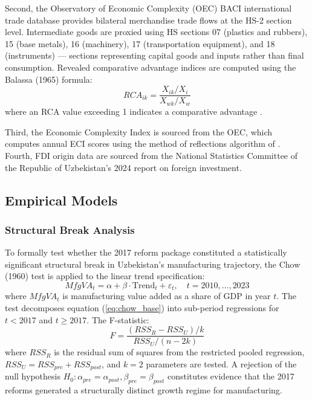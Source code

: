 Second, the Observatory of Economic Complexity (OEC) BACI international trade database provides bilateral merchandise trade flows at the HS-2 section level. Intermediate goods are proxied using HS sections 07 (plastics and rubbers), 15 (base metals), 16 (machinery), 17 (transportation equipment), and 18 (instruments) --- sections representing capital goods and inputs rather than final consumption. Revealed comparative advantage indices are computed using the Balassa (1965) formula:
\begin{equation}
RCA_{ik} = \frac{X_{ik}/X_i}{X_{wk}/X_w}
\label{eq:rca}
\end{equation}
where an RCA value exceeding 1 indicates a comparative advantage \citep{balassa1965}.

Third, the Economic Complexity Index is sourced from the OEC, which computes annual ECI scores using the method of reflections algorithm of \citet{hidalgo2009}. Fourth, FDI origin data are sourced from the National Statistics Committee of the Republic of Uzbekistan's 2024 report on foreign investment.

\subsection{Empirical Models}

\subsubsection{Structural Break Analysis}

To formally test whether the 2017 reform package constituted a statistically significant structural break in Uzbekistan's manufacturing trajectory, the Chow (1960) test is applied to the linear trend specification:
\begin{equation}
 MfgVA_t = \alpha + \beta \cdot \text{Trend}_t + \varepsilon_t, \quad t = 2010, \ldots, 2023
 \label{eq:chow_base}
\end{equation}
where $MfgVA_t$ is manufacturing value added as a share of GDP in year $t$. The test decomposes equation (\ref{eq:chow_base}) into sub-period regressions for $t < 2017$ and $t \geq 2017$. The F-statistic:
\begin{equation}
 F = \frac{(RSS_R - RSS_U)/k}{RSS_U/(n-2k)}
 \label{eq:chow_f}
\end{equation}
where $RSS_R$ is the residual sum of squares from the restricted pooled regression, $RSS_U = RSS_{pre} + RSS_{post}$, and $k=2$ parameters are tested. A rejection of the null hypothesis $H_0: \alpha_{pre} = \alpha_{post}, \beta_{pre} = \beta_{post}$ constitutes evidence that the 2017 reforms generated a structurally distinct growth regime for manufacturing.

